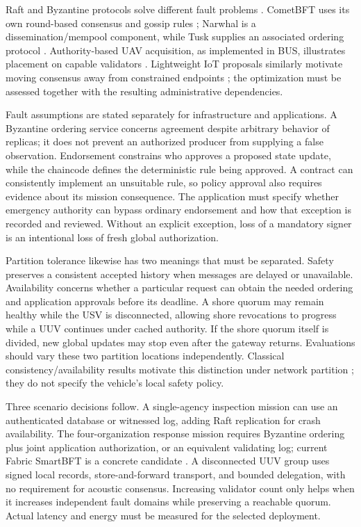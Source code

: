 Raft and Byzantine protocols solve different fault problems \citep{raft2014,pbft1999,hotstuff2019}. CometBFT uses its own round-based consensus and gossip rules \citep{cometbft2026}; Narwhal is a dissemination/mempool component, while Tusk supplies an associated ordering protocol \citep{narwhal2022}. Authority-based UAV acquisition, as implemented in BUS, illustrates placement on capable validators \citep{islam2019bus}. Lightweight IoT proposals similarly motivate moving consensus away from constrained endpoints \citep{dorri2017towards}; the optimization must be assessed together with the resulting administrative dependencies.

Fault assumptions are stated separately for infrastructure and applications. A Byzantine ordering service concerns agreement despite arbitrary behavior of replicas; it does not prevent an authorized producer from supplying a false observation. Endorsement constrains who approves a proposed state update, while the chaincode defines the deterministic rule being approved. A contract can consistently implement an unsuitable rule, so policy approval also requires evidence about its mission consequence. The application must specify whether emergency authority can bypass ordinary endorsement and how that exception is recorded and reviewed. Without an explicit exception, loss of a mandatory signer is an intentional loss of fresh global authorization.

Partition tolerance likewise has two meanings that must be separated. Safety preserves a consistent accepted history when messages are delayed or unavailable. Availability concerns whether a particular request can obtain the needed ordering and application approvals before its deadline. A shore quorum may remain healthy while the USV is disconnected, allowing shore revocations to progress while a UUV continues under cached authority. If the shore quorum itself is divided, new global updates may stop even after the gateway returns. Evaluations should vary these two partition locations independently. Classical consistency/availability results motivate this distinction under network partition \citep{gilbert2002brewer}; they do not specify the vehicle's local safety policy.

Three scenario decisions follow. A single-agency inspection mission can use an authenticated database or witnessed log, adding Raft replication for crash availability. The four-organization response mission requires Byzantine ordering plus joint application authorization, or an equivalent validating log; current Fabric SmartBFT is a concrete candidate \citep{fabric2026bft}. A disconnected UUV group uses signed local records, store-and-forward transport, and bounded delegation, with no requirement for acoustic consensus. Increasing validator count only helps when it increases independent fault domains while preserving a reachable quorum. Actual latency and energy must be measured for the selected deployment.

